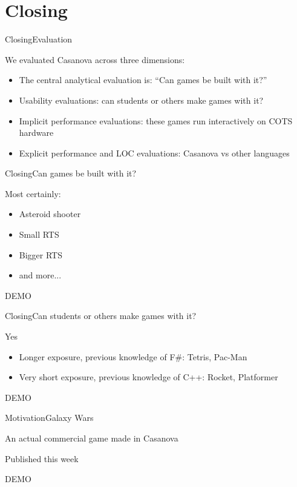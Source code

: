 \documentclass{beamer}
\begin{document}
\section{Closing}
\begin{slide}{Closing}{Evaluation}{
\item We evaluated Casanova across three dimensions:
\begin{itemize}
\item The central analytical evaluation is: ``Can games be built with it?''
\item Usability evaluations: can students or others make games with it?
\item Implicit performance evaluations: these games run interactively on COTS hardware
\item Explicit performance and LOC evaluations: Casanova vs other languages
\end{itemize}
}\end{slide}


\begin{slide}{Closing}{Can games be built with it?}{
\item Most certainly:
\begin{itemize}
\item Asteroid shooter
\item Small RTS
\item Bigger RTS
\item and more...
\end{itemize}
\item DEMO
}\end{slide}


\begin{slide}{Closing}{Can students or others make games with it?}{
\item Yes
\begin{itemize}
\item Longer exposure, previous knowledge of F\#: Tetris, Pac-Man
\item Very short exposure, previous knowledge of C++: Rocket, Platformer
\end{itemize}
\item DEMO
}\end{slide}


\begin{slide}{Motivation}{Galaxy Wars}{
\item An actual commercial game made in Casanova
\item Published this week
\item DEMO
}\end{slide}
\end{document}
